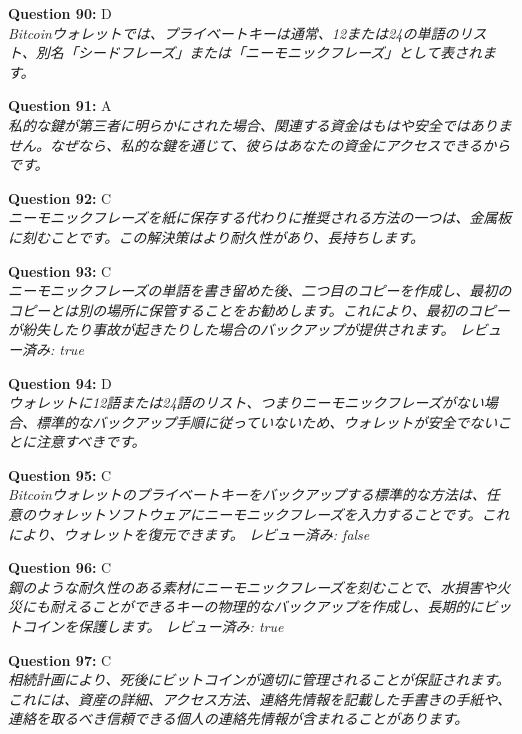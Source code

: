 \documentclass[12pt,a4paper]{article}
\begin{document}
\begin{enumerate}
{{{{{{\item \textbf{Question 90:} D
\\ \textit{Bitcoinウォレットでは、プライベートキーは通常、12または24の単語のリスト、別名「シードフレーズ」または「ニーモニックフレーズ」として表されます。}

\item \textbf{Question 91:} A
\\ \textit{私的な鍵が第三者に明らかにされた場合、関連する資金はもはや安全ではありません。なぜなら、私的な鍵を通じて、彼らはあなたの資金にアクセスできるからです。}

\item \textbf{Question 92:} C
\\ \textit{ニーモニックフレーズを紙に保存する代わりに推奨される方法の一つは、金属板に刻むことです。この解決策はより耐久性があり、長持ちします。}

\item \textbf{Question 93:} C
\\ \textit{ニーモニックフレーズの単語を書き留めた後、二つ目のコピーを作成し、最初のコピーとは別の場所に保管することをお勧めします。これにより、最初のコピーが紛失したり事故が起きたりした場合のバックアップが提供されます。
レビュー済み: true}

\item \textbf{Question 94:} D
\\ \textit{ウォレットに12語または24語のリスト、つまりニーモニックフレーズがない場合、標準的なバックアップ手順に従っていないため、ウォレットが安全でないことに注意すべきです。}

\item \textbf{Question 95:} C
\\ \textit{Bitcoinウォレットのプライベートキーをバックアップする標準的な方法は、任意のウォレットソフトウェアにニーモニックフレーズを入力することです。これにより、ウォレットを復元できます。
レビュー済み: false}

\item \textbf{Question 96:} C
\\ \textit{鋼のような耐久性のある素材にニーモニックフレーズを刻むことで、水損害や火災にも耐えることができるキーの物理的なバックアップを作成し、長期的にビットコインを保護します。
レビュー済み: true}

\item \textbf{Question 97:} C
\\ \textit{相続計画により、死後にビットコインが適切に管理されることが保証されます。これには、資産の詳細、アクセス方法、連絡先情報を記載した手書きの手紙や、連絡を取るべき信頼できる個人の連絡先情報が含まれることがあります。}

}}}}}}
\end{enumerate}
\end{document}
